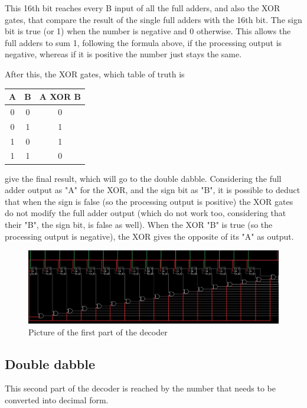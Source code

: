 \documentclass{article}
\begin{document}
This 16th bit reaches every B input of all the full adders, and also the XOR gates, that compare the result of the single full adders with the 16th bit. The sign bit is true (or 1) when the number is negative and 0 otherwise. This allows the full adders to sum 1, following the formula above, if the processing output is negative, whereas if it is positive the number just stays the same.

After this, the XOR gates, which table of truth is 
\begin{center}
\begin{tabular}{||c|c||c||}
    \hline
    A & B & A XOR B \\
    \hline
    0 & 0 & 0 \\
    \hline
    0 & 1 & 1 \\
    \hline
    1 & 0 & 1 \\
    \hline
    1 & 1 & 0 \\
    \hline
\end{tabular}
\end{center}

give the final result, which will go to the double dabble. Considering the full adder output as "A" for the XOR, and the sign bit as "B", it is possible to deduct that when the sign is false (so the processing output is positive) the XOR gates do not modify the full adder output (which do not work too, considering that their "B", the sign bit, is false as well). When the XOR "B" is true (so the processing output is negative), the XOR gives the opposite of its "A" as output.

\begin{figure}[h]
    \centering
    \includegraphics[scale=0.43]{SC_Converter.JPG}
    \caption{Picture of the first part of the decoder}
    \label{Converter}
  \end{figure}

\subsection{Double dabble}

This second part of the decoder is reached by the number that needs to be converted into decimal form. 
\end{document}
